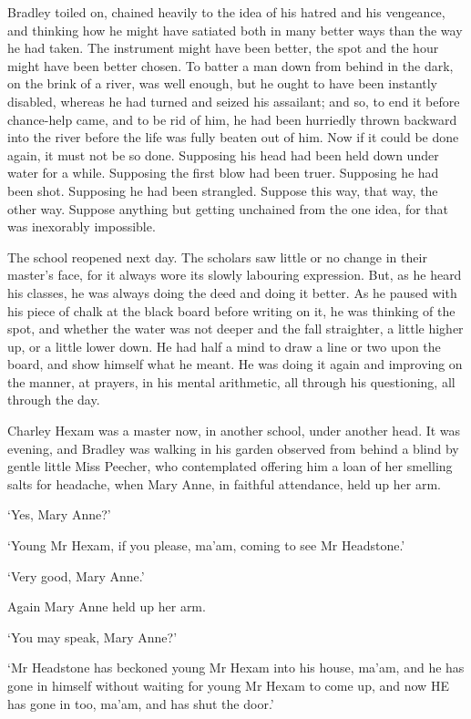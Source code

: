 Bradley toiled on, chained heavily to the idea of his hatred and his
vengeance, and thinking how he might have satiated both in many better
ways than the way he had taken. The instrument might have been better,
the spot and the hour might have been better chosen. To batter a man
down from behind in the dark, on the brink of a river, was well enough,
but he ought to have been instantly disabled, whereas he had turned and
seized his assailant; and so, to end it before chance-help came, and
to be rid of him, he had been hurriedly thrown backward into the river
before the life was fully beaten out of him. Now if it could be done
again, it must not be so done. Supposing his head had been held down
under water for a while. Supposing the first blow had been truer.
Supposing he had been shot. Supposing he had been strangled. Suppose
this way, that way, the other way. Suppose anything but getting
unchained from the one idea, for that was inexorably impossible.

The school reopened next day. The scholars saw little or no change in
their master’s face, for it always wore its slowly labouring expression.
But, as he heard his classes, he was always doing the deed and doing it
better. As he paused with his piece of chalk at the black board before
writing on it, he was thinking of the spot, and whether the water was
not deeper and the fall straighter, a little higher up, or a little
lower down. He had half a mind to draw a line or two upon the board, and
show himself what he meant. He was doing it again and improving on
the manner, at prayers, in his mental arithmetic, all through his
questioning, all through the day.

Charley Hexam was a master now, in another school, under another head.
It was evening, and Bradley was walking in his garden observed from
behind a blind by gentle little Miss Peecher, who contemplated offering
him a loan of her smelling salts for headache, when Mary Anne, in
faithful attendance, held up her arm.

‘Yes, Mary Anne?’

‘Young Mr Hexam, if you please, ma’am, coming to see Mr Headstone.’

‘Very good, Mary Anne.’

Again Mary Anne held up her arm.

‘You may speak, Mary Anne?’

‘Mr Headstone has beckoned young Mr Hexam into his house, ma’am, and he
has gone in himself without waiting for young Mr Hexam to come up, and
now HE has gone in too, ma’am, and has shut the door.’

